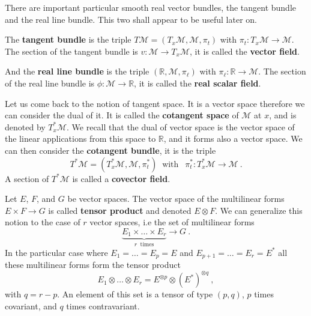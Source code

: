 \documentclass[11pt]{book}
\newcommand{\Mcal}{\mathcal{M}}
\newcommand{\Rbb}{\mathbb{R}}
\theoremstyle{break}
\begin{document}


There are important particular smooth real vector bundles, the tangent bundle and the real line bundle. This two shall appear to be useful later on. 




The \textbf{tangent bundle} is the triple $T\Mcal=(T_x\Mcal, \Mcal, \pi_t)$ with $\pi_t : T_x\Mcal \to \Mcal$. The section of the tangent bundle is $v : \Mcal \to T_x\Mcal$, it is called the \textbf{vector field}. 




And the \textbf{real line bundle} is the triple $(\Rbb, \Mcal, \pi_\ell)$ with $\pi_\ell : \Rbb \to \Mcal$. The section of the real line bundle is $\phi : \Mcal \to \Rbb$, it is called the \textbf{real scalar field}. 




Let us come back to the notion of tangent space. It is a vector space therefore we can consider the dual of it. It is called the \textbf{cotangent space} of $\Mcal$ at $x$, and is denoted by $T^\ast_x\Mcal$. We recall that the dual of vector space is the vector space of the linear applications from this space to $\Rbb$, and it forms also a vector space. We can then consider the \textbf{cotangent bundle}, it is the triple
%
\begin{equation*}
T^\ast\Mcal=(T^\ast_x\Mcal, \Mcal, \pi^\ast_t) \ \mbox{ with } \ \ \pi^\ast_t : T^\ast_x\Mcal \to \Mcal \ .
\end{equation*}
%
A section of $T^\ast\Mcal$ is called a \textbf{covector field}.




Let $E$, $F$, and $G$ be vector spaces. The vector space of the multilinear forms $E \times F \to G$ is called \textbf{tensor product} and denoted $E \otimes F$. We can generalize this notion to the case of $r$ vector spaces, i.e the set of multilinear forms
%
\begin{equation*}
\underbrace{E_1 \times \dots \times E_r}_{r \ \mbox{ times}} \to G \ .
\end{equation*}
%
In the particular case where $E_1 = \dots = E_p = E$ and $E_{p+1} = \dots = E_r = E^\ast$ all these multilinear forms form the tensor product 
%
\begin{equation*}
E_1 \otimes \dots \otimes E_r = E^{\otimes p} \otimes (E^\ast)^{\otimes q} \ ,
\end{equation*}
%
with $q=r-p$. An element of this set is a tensor of type $(p,q)$, $p$ times covariant, and $q$ times contravariant. 
\end{document}
